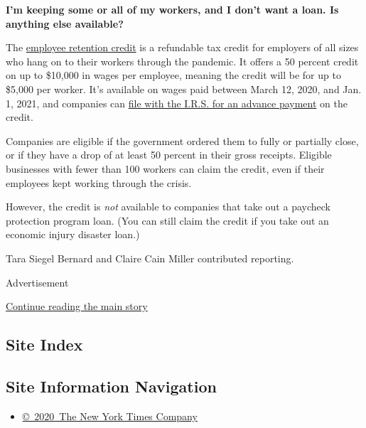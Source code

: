 \textbf{I'm keeping some or all of my workers, and I don't want a loan.
Is anything else available?}

The
\href{https://www.irs.gov/newsroom/irs-employee-retention-credit-available-for-many-businesses-financially-impacted-by-covid-19}{employee
retention credit} is a refundable tax credit for employers of all sizes
who hang on to their workers through the pandemic. It offers a 50
percent credit on up to \$10,000 in wages per employee, meaning the
credit will be for up to \$5,000 per worker. It's available on wages
paid between March 12, 2020, and Jan. 1, 2021, and companies can
\href{https://www.irs.gov/forms-pubs/about-form-7200}{file with the
I.R.S. for an advance payment} on the credit.

Companies are eligible if the government ordered them to fully or
partially close, or if they have a drop of at least 50 percent in their
gross receipts. Eligible businesses with fewer than 100 workers can
claim the credit, even if their employees kept working through the
crisis.

However, the credit is \emph{not} available to companies that take out a
paycheck protection program loan. (You can still claim the credit if you
take out an economic injury disaster loan.)

Tara Siegel Bernard and Claire Cain Miller contributed reporting.

Advertisement

\protect\hyperlink{after-bottom}{Continue reading the main story}

\hypertarget{site-index}{%
\subsection{Site Index}\label{site-index}}

\hypertarget{site-information-navigation}{%
\subsection{Site Information
Navigation}\label{site-information-navigation}}

\begin{itemize}
\tightlist
\item
  \href{https://help.nytimes.com/hc/en-us/articles/115014792127-Copyright-notice}{©~2020~The
  New York Times Company}
\end{itemize}

